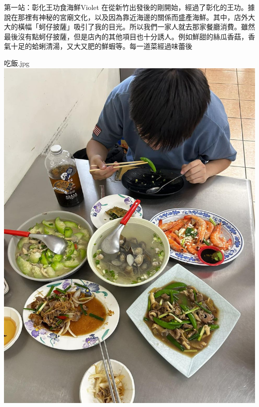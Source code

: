 \documentclass{article}
\begin{document}

\begin{large}
\begin{boxpar}{第一站：彰化王功食海鮮}{Violet}
在從新竹出發後的剛開始，經過了彰化的王功。據說在那裡有神秘的宮廟文化，以及因為靠近海邊的關係而盛產海鮮。其中，店外大大的橫幅「蚵仔披薩」吸引了我的目光。所以我們一家人就去那家餐廳消費。雖然最後沒有點蚵仔披薩，但是店內的其他項目也十分誘人。例如鮮甜的絲瓜香菇，香氣十足的蛤蜊清湯，又大又肥的鮮蝦等。每一道菜經過味蕾後
\end{boxpar}

\begin{imgbox}{吃飯.jpg}
    \includegraphics[width=0.65\textheight]{src/seafood.jpg}
\end{imgbox}
\end{large}
\end{document}
